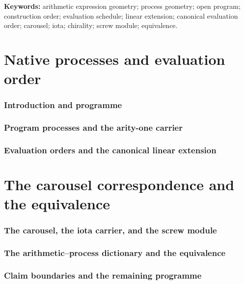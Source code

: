 \documentclass[11pt]{article}
\theoremstyle{definition}
\theoremstyle{remark}
\begin{document}
\noindent\textbf{Keywords:}
arithmetic expression geometry; process geometry; open program; construction order;
evaluation schedule; linear extension; canonical evaluation order; carousel; iota;
chirality; screw module; equivalence.

\setcounter{tocdepth}{2}
\tableofcontents
\newpage

\part{Native processes and evaluation order}

\section{Introduction and programme}\label{sec:introduction}


\section{Program processes and the arity-one carrier}\label{sec:processes}


\section{Evaluation orders and the canonical linear extension}\label{sec:orders}


\part{The carousel correspondence and the equivalence}

\section{The carousel, the iota carrier, and the screw module}\label{sec:carousel}


\section{The arithmetic--process dictionary and the equivalence}\label{sec:equivalence}


\section{Claim boundaries and the remaining programme}\label{sec:boundaries}




\end{document}
